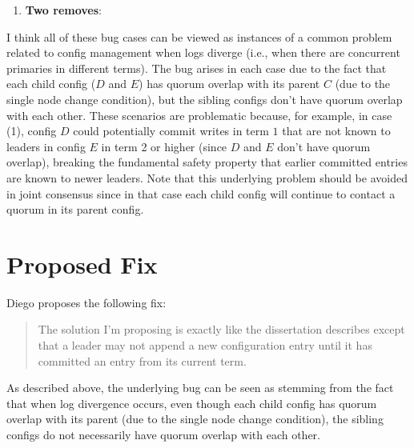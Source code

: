 \documentclass[
]{article}
\begin{document}
\begin{enumerate}[(1)]
\item \textbf{Two removes}:
\begin{center}
\end{center}

\end{enumerate}

I think all of these bug cases can be viewed as instances of a common problem related to config management when logs diverge (i.e., when there are concurrent primaries in different terms). The bug arises in each case due to the fact that each child config ($D$ and $E$) has quorum overlap with its parent $C$ (due to the single node change condition), but the sibling configs don't have quorum overlap with each other. These scenarios are problematic because, for example, in case (1), config $D$ could potentially commit writes in term $1$ that are not known to leaders in config $E$ in term 2 or higher (since $D$ and $E$ don't have quorum overlap), breaking the fundamental safety property that earlier committed entries are known to newer leaders.
%
Note that this underlying problem should be avoided in joint consensus since in that case each child config will continue to contact a quorum in its parent config.

\section*{Proposed Fix}

Diego proposes the following fix:
\begin{quotation}
    The solution I'm proposing is exactly like the dissertation describes except that a leader may not append a new configuration entry until it has committed an entry from its current term.
\end{quotation}
As described above, the underlying bug can be seen as stemming from the fact that when log divergence occurs, even though each child config has quorum overlap with its parent (due to the single node change condition), the sibling configs do not necessarily have quorum overlap with each other. 
\end{document}
